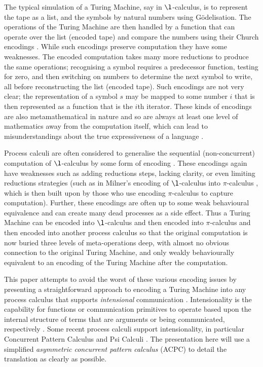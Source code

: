 \documentclass[submission,copyright,creativecommons]{eptcs}
\begin{document}
The typical simulation of a Turing Machine, say in $\l$-calculus, is to
represent the tape as a list, and the symbols by natural numbers using G\"odelisation.
The operations of the Turing Machine are then handled by a function that
can operate over the list (encoded tape) and compare the numbers using their
Church encodings \cite{Barendregt85}.
While such encodings preserve computation they have some weaknesses.
The encoded computation takes many more reductions to produce the same operations;
recognising a symbol requires a predecessor function, testing for zero, and then
switching on numbers to determine the next symbol to write, all before
reconstructing the list (encoded tape).
Such encodings are not very clear; the representation of a symbol $s$ may be
mapped to some number $i$ that is then represented as a function that is the
$i$th iterator.
These kinds of encodings are also metamathematical \cite{Tarski56logic} in nature and
so are always at least one level of mathematics away from the computation itself,
which can lead to misunderstandings about the true expressiveness of a
language \cite{jay2011}.

Process calculi are often considered to generalise the sequential (non-concurrent)
computation of $\l$-calculus by some form of encoding
\cite{90426,Berry:1989:CAM:96709.96717,Milner:1992:CMP:162037.162038,Milner:1992:CMP:162037.162039,DBLP:conf/fossacs/CardelliG98,DBLP:books/daglib/0098267,
705654}.
These encodings again have weaknesses such as adding reductions steps,
lacking clarity, or even limiting reductions strategies (such as in
Milner's encoding of $\l$-calculus into $\pi$-calculus \cite{90426}, which is
then built upon by those who use encoding $\pi$-calculus to capture
computation).
Further, these encodings are often up to some weak behavioural equivalence and
can create many dead processes as a side effect.
Thus a Turing Machine can be encoded into $\l$-calculus and then encoded into
$\pi$-calculus and then encoded into another process calculus so that the 
original computation is now buried three levels of meta-operations deep,
with almost no obvious connection to the original Turing Machine,
and only weakly behaviourally equivalent to an encoding of the Turing Machine
after the computation.

This paper attempts to avoid the worst of these various encoding issues by
presenting a straightforward approach to encoding a Turing Machine into any process
calculus that supports {\em intensional} communication
\cite{GivenWilsonPhD,GivenWilsonGorla13}.
Intensionality is the capability for functions or communication primitives
to operate based upon the internal structure of terms that are arguments
or being communicated, respectively \cite{jay2011,GivenWilsonPhD}.
Some recent process calculi support intensionality, in particular
Concurrent Pattern Calculus \cite{GivenWilsonGorlaJay10,givenwilson:hal-00987578} and
Psi Calculi \cite{BJPV11}.
The presentation here will use a simplified {\em asymmetric concurrent
pattern calculus} (ACPC) to detail the translation as clearly as possible.
\end{document}
